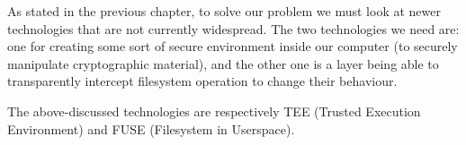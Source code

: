 \documentclass[../main.tex]{subfiles}
\begin{document}
\par As stated in the previous chapter, to solve our problem we must look at newer technologies that are not currently widespread. The two technologies we need are: one for creating some sort of secure environment inside our computer (to securely manipulate cryptographic material), and the other one is a layer being able to transparently intercept filesystem operation to change their behaviour.
\par The above-discussed technologies are respectively TEE (Trusted Execution Environment) and FUSE (Filesystem in Userspace).
\end{document}
